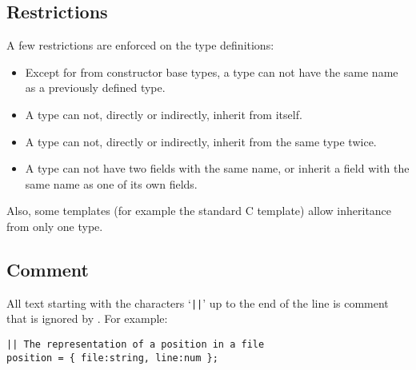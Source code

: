 \subsection{Restrictions}
A few restrictions are enforced on the type definitions:
\begin{itemize}
\item Except for from constructor base types, a type can not have
the same name as a previously defined type.
\item A type can not, directly or indirectly, inherit from itself.
\item A type can not, directly or indirectly, inherit from the same type
twice.
\item A type can not have two fields with the same name, or inherit
a field with the same name as one of its own fields.
\end{itemize}

Also, some templates (for example the standard C template) allow inheritance
from only one type.
\subsection{Comment}
All text starting with the characters `\texttt{||}' up to the end of the line
is comment that is ignored by {\Tm}.
For example:
\begin{showfile}
\begin{verbatim}
|| The representation of a position in a file
position = { file:string, line:num };
\end{verbatim}
\end{showfile}
